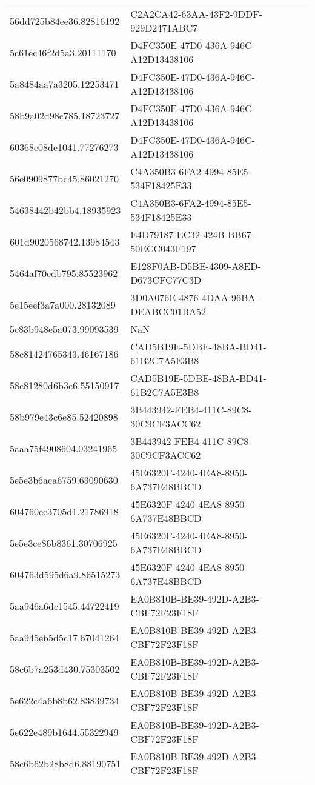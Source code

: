 \begin{tabular}{ll}
56dd725b84ee36.82816192 & C2A2CA42-63AA-43F2-9DDF-929D2471ABC7 \\
5c61ec46f2d5a3.20111170 & D4FC350E-47D0-436A-946C-A12D13438106 \\
5a8484aa7a3205.12253471 & D4FC350E-47D0-436A-946C-A12D13438106 \\
58b9a02d98c785.18723727 & D4FC350E-47D0-436A-946C-A12D13438106 \\
60368e08de1041.77276273 & D4FC350E-47D0-436A-946C-A12D13438106 \\
56e0909877bc45.86021270 & C4A350B3-6FA2-4994-85E5-534F18425E33 \\
54638442b42bb4.18935923 & C4A350B3-6FA2-4994-85E5-534F18425E33 \\
601d9020568742.13984543 & E4D79187-EC32-424B-BB67-50ECC043F197 \\
5464af70edb795.85523962 & E128F0AB-D5BE-4309-A8ED-D673CFC77C3D \\
5e15eef3a7a000.28132089 & 3D0A076E-4876-4DAA-96BA-DEABCC01BA52 \\
5c83b948e5a073.99093539 & NaN \\
58c81424765343.46167186 & CAD5B19E-5DBE-48BA-BD41-61B2C7A5E3B8 \\
58c81280d6b3c6.55150917 & CAD5B19E-5DBE-48BA-BD41-61B2C7A5E3B8 \\
58b979e43c6e85.52420898 & 3B443942-FEB4-411C-89C8-30C9CF3ACC62 \\
5aaa75f4908604.03241965 & 3B443942-FEB4-411C-89C8-30C9CF3ACC62 \\
5e5e3b6aca6759.63090630 & 45E6320F-4240-4EA8-8950-6A737E48BBCD \\
604760ec3705d1.21786918 & 45E6320F-4240-4EA8-8950-6A737E48BBCD \\
5e5e3ce86b8361.30706925 & 45E6320F-4240-4EA8-8950-6A737E48BBCD \\
604763d595d6a9.86515273 & 45E6320F-4240-4EA8-8950-6A737E48BBCD \\
5aa946a6dc1545.44722419 & EA0B810B-BE39-492D-A2B3-CBF72F23F18F \\
5aa945eb5d5c17.67041264 & EA0B810B-BE39-492D-A2B3-CBF72F23F18F \\
58c6b7a253d430.75303502 & EA0B810B-BE39-492D-A2B3-CBF72F23F18F \\
5e622c4a6b8b62.83839734 & EA0B810B-BE39-492D-A2B3-CBF72F23F18F \\
5e622e489b1644.55322949 & EA0B810B-BE39-492D-A2B3-CBF72F23F18F \\
58c6b62b28b8d6.88190751 & EA0B810B-BE39-492D-A2B3-CBF72F23F18F \\

\end{tabular}
